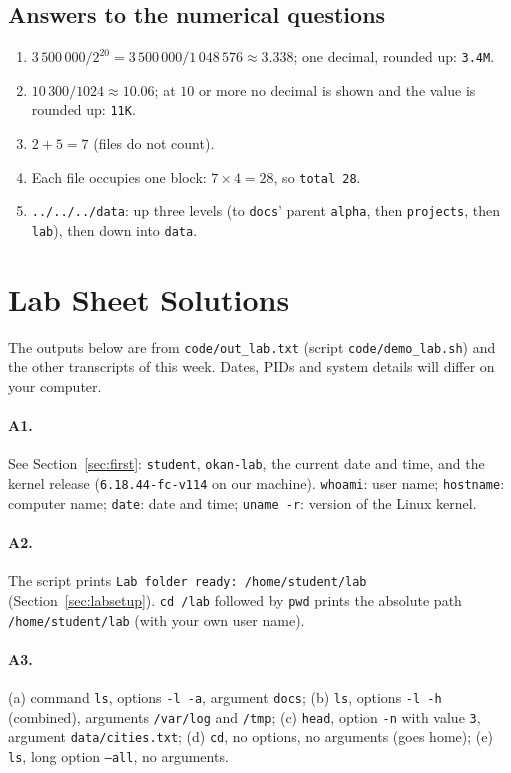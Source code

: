 \documentclass[11pt,a4paper]{article}
\newcommand{\cmd}[1]{\texttt{#1}}
\begin{document}
\subsection*{Answers to the numerical questions}
\begin{enumerate}[leftmargin=1.6em,start=10]
  \item $3\,500\,000 / 2^{20} = 3\,500\,000 / 1\,048\,576 \approx 3.338$; one decimal, rounded up: \texttt{3.4M}.
  \item $10\,300 / 1024 \approx 10.06$; at $10$ or more no decimal is shown and the value is rounded up: \texttt{11K}.
  \item $2 + 5 = 7$ (files do not count).
  \item Each file occupies one block: $7 \times 4 = 28$, so \texttt{total 28}.
  \item \texttt{../../../data}: up three levels (to \texttt{docs}' parent \texttt{alpha}, then \texttt{projects}, then \texttt{lab}), then down into \texttt{data}.
\end{enumerate}

\section{Lab Sheet Solutions}
\label{sec:labsol}

The outputs below are from \texttt{code/out\_lab.txt} (script \texttt{code/demo\_lab.sh}) and the other transcripts of this week. Dates, PIDs and system details will differ on your computer.

\paragraph{A1.} See Section~\ref{sec:first}: \texttt{student}, \texttt{okan-lab}, the current date and time, and the kernel release (\texttt{6.18.44-fc-v114} on our machine). \cmd{whoami}: user name; \cmd{hostname}: computer name; \cmd{date}: date and time; \cmd{uname -r}: version of the Linux kernel.

\paragraph{A2.} The script prints \texttt{Lab folder ready: /home/student/lab} (Section~\ref{sec:labsetup}). \cmd{cd \tl/lab} followed by \cmd{pwd} prints the absolute path \texttt{/home/student/lab} (with your own user name).

\paragraph{A3.} (a) command \cmd{ls}, options \texttt{-l -a}, argument \texttt{docs}; (b) \cmd{ls}, options \texttt{-l -h} (combined), arguments \texttt{/var/log} and \texttt{/tmp}; (c) \cmd{head}, option \texttt{-n} with value \texttt{3}, argument \texttt{data/cities.txt}; (d) \cmd{cd}, no options, no arguments (goes home); (e) \cmd{ls}, long option \texttt{--all}, no arguments.
\end{document}
